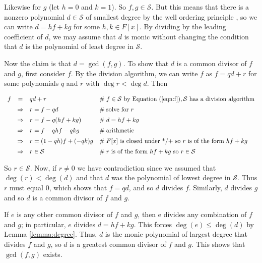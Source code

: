 \documentclass{article}
\theoremstyle{definition}
\begin{document}
\bigskip
\noindent
Likewise for $g$ (let $h = 0$ and $k = 1$). So $f,g \in
\mathcal{S}$. But this means that there is a nonzero polynomial
$d \in \mathcal{S}$ of smallest degree by the well ordering
principle \cite{well_ordering_principle}, so we can write $d = hf
+ kg$ for some $h, k \in F [x]$. By dividing by the leading
coefficient of $d$, we may assume that $d$ is monic without
changing the condition that $d$ is the polynomial of least degree
in $\mathcal{S}$.

\bigskip
\noindent
Now the claim is that $d = \gcd(f,g)$. To show that $d$ is a
common divisor of $f$ and $g$, first consider $f$. By the
division algorithm, we can write $f$ as $f = qd + r$ for some
polynomials $q$ and $r$ with $\deg r < \deg d$. Then

\begin{equation}
\begin{array}{rcll}
f
&=& qd +  r                             
			&\mathrel{\#} f \in \mathcal{S} \text{ by Equation (\ref{eqn:f})}, 
				\mathcal{S} \text{ has a division algorithm} \\
[5pt]
&\Rightarrow& r = f  - qd                 
			&\mathrel{\#} \text{solve for $r$} \\
[5pt]
&\Rightarrow& r = f - q(hf + kg)           
			&\mathrel{\#} d = hf + kg \\
[5pt]
&\Rightarrow& r = f - qhf  - qkg           
			&\mathrel{\#} \text{arithmetic} \\
[5pt]
&\Rightarrow& r = (1 - qh)f  + (-qk)g      
			&\mathrel{\#} F[x] \text{ is closed under */+ so } r  \text{ is of the form } hf + kg \\
[5pt]
&\Rightarrow&  r \in \mathcal{S}           
			&\mathrel{\#} r \text{ is of the form } hf + kg \text{ so } r \in \mathcal{S} 
\end{array}
\label{eqn:division}
\end{equation}


\bigskip
\noindent
So $r \in \mathcal{S}$. Now, if $r \neq 0$ we have contradiction
since we assumed that $\deg(r) < \deg(d)$ and that $d$ was the
polynomial of lowest degree in $\mathcal{S}$. Thus $r$ must equal
$0$, which shows that $f = qd$, and so $d$ divides
$f$. Similarly, $d$ divides $g$ and so $d$ is a common divisor of
$f$ and $g$.

\bigskip
\noindent
If $e$ is any other common divisor of $f$ and $g$, then e divides
any combination of $f$ and $g$; in particular, $e$ divides $d= hf
+ kg $.  This forces $\deg(e) \leq \deg(d)$ by Lemma
\ref{lemma:degree}. Thus, $d$ is the monic polynomial of largest
degree that divides $f$ and $g$, so $d$ is a greatest common
divisor of $f$ and $g$.  This shows that $\gcd(f,g)$ exists.
\end{document}
